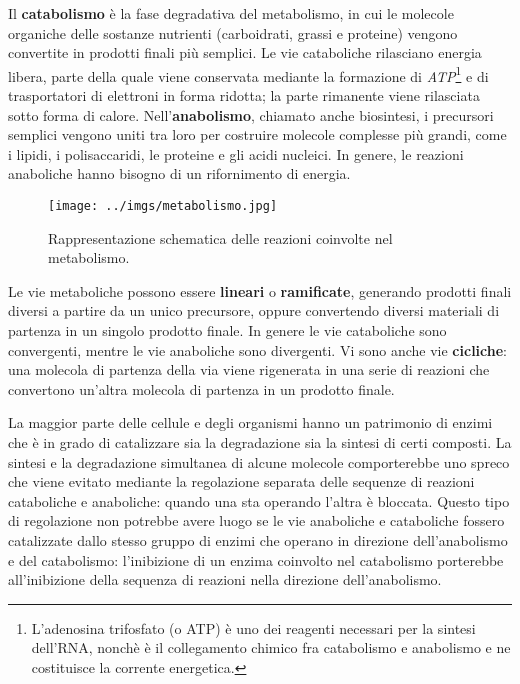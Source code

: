 Il \textbf{catabolismo} è la fase degradativa del metabolismo, in cui le molecole organiche delle sostanze nutrienti (carboidrati, grassi e proteine) vengono convertite in prodotti finali più semplici. 
Le vie cataboliche rilasciano energia libera, parte della quale viene conservata mediante la formazione di \textit{ATP}\footnote{L'adenosina trifosfato (o ATP) è uno dei reagenti necessari per la sintesi dell'RNA, nonchè è il collegamento chimico fra catabolismo e anabolismo e ne costituisce la corrente energetica.} e di trasportatori di elettroni in forma ridotta; la parte rimanente viene rilasciata sotto forma di calore.
Nell'\textbf{anabolismo}, chiamato anche biosintesi, i precursori semplici vengono uniti tra loro per costruire molecole complesse più grandi, come i lipidi, i polisaccaridi, le proteine e gli acidi nucleici. 
In genere, le reazioni anaboliche hanno bisogno di un rifornimento di energia.

\begin{figure}[h]
\begin{center}
\texttt{[image: ../imgs/metabolismo.jpg]}
\caption[Vie Metaboliche]{Rappresentazione schematica delle reazioni coinvolte nel metabolismo.}
\label{Fig:metabolismo}
\end{center}
\end{figure}

Le vie metaboliche possono essere \textbf{lineari} o \textbf{ramificate}, generando prodotti finali diversi a partire da un unico precursore, oppure convertendo diversi materiali di partenza in un singolo prodotto finale. 
In genere le vie cataboliche sono convergenti, mentre le vie anaboliche sono divergenti. 
Vi sono anche vie \textbf{cicliche}: una molecola di partenza della via viene rigenerata in una serie di reazioni che convertono un'altra molecola di partenza in un prodotto finale.

La maggior parte delle cellule e degli organismi hanno un patrimonio di enzimi che è in grado di catalizzare sia la degradazione sia la sintesi di certi composti.
La sintesi e la degradazione simultanea di alcune molecole comporterebbe uno spreco che viene evitato mediante la regolazione separata delle sequenze di reazioni cataboliche e anaboliche: quando una sta operando l'altra è bloccata.
Questo tipo di regolazione non potrebbe avere luogo se le vie anaboliche e cataboliche fossero catalizzate dallo stesso gruppo di enzimi che operano in direzione dell'anabolismo e del catabolismo: l'inibizione di un enzima coinvolto nel catabolismo porterebbe all'inibizione della sequenza di reazioni nella direzione dell'anabolismo. 


